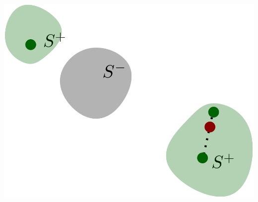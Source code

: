 \begin{frame}
\begin{center}
\begin{overprint}
    \vspace{1.12cm} \hspace{-0.65cm}\centering\includegraphics[scale=0.25]{imgs/mwmote-clusters.png}
  \end{overprint}
 \end{center}
 \end{frame}
 
